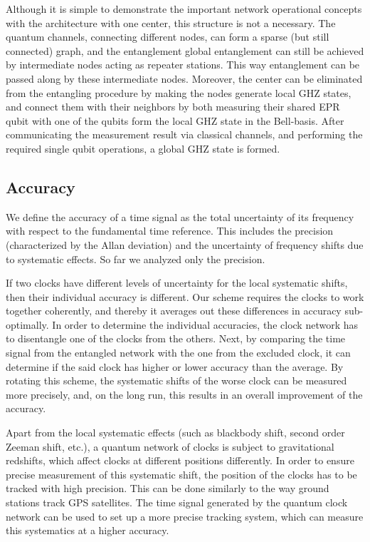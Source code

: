Although it is simple to demonstrate the important network operational concepts
with the architecture with one center, this structure is not a necessary. The
quantum channels, connecting different nodes, can form a sparse (but still connected)
graph, and the entanglement global entanglement can still be achieved by
intermediate nodes acting as repeater stations. This way entanglement can be
passed along by these intermediate nodes. Moreover, the center can be eliminated
from the entangling procedure by making the nodes generate local GHZ states, and
connect them with their neighbors by both measuring their shared EPR qubit with
one of the qubits form the local GHZ state in the Bell-basis. After
communicating the measurement result via classical channels, and performing the
required single qubit operations, a global GHZ state is formed.


\subsection{Accuracy}
We define the accuracy of a time signal as the total uncertainty of its
frequency with respect to the fundamental time reference. This includes the
precision (characterized by the Allan deviation) and the uncertainty of
frequency shifts due to systematic effects. So far we analyzed only the
precision.

If two clocks have different levels of uncertainty for the local systematic
shifts, then their individual accuracy is different. Our scheme requires the
clocks to work together coherently, and thereby it averages out these
differences in accuracy sub-optimally. In order to determine the individual
accuracies, the clock network has to disentangle one of the clocks from the
others. Next, by comparing the time signal from the
entangled network with the one from the excluded clock, it can determine if the
said clock has higher or lower accuracy than the average. By rotating this
scheme, the systematic shifts of the worse clock can be measured more precisely,
and, on the long run, this results in an overall improvement of the accuracy.

Apart from the local systematic effects (such as blackbody shift, second order
Zeeman shift, etc.), a quantum network of clocks is subject to gravitational
redshifts, which affect clocks at different positions differently. In order to
ensure precise measurement of this systematic shift, the position of the clocks
has to be tracked with high precision. This can be done similarly to the way
ground stations track GPS satellites. The time signal generated
by the quantum clock network can be used to set up a more precise
tracking system, which can measure this systematics at a higher
accuracy.






